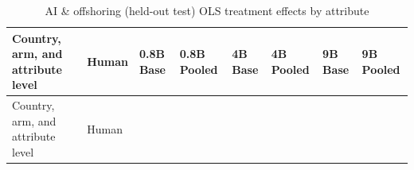 \documentclass[
  11pt,
  letterpaper,
]{article}
\makeatletter
\newcommand\table@defaultsize{\footnotesize}
\let\table@size\table@defaultsize
\newcommand\nexttablesize[1]{\gdef\table@size{#1}}
\makeatother
\begin{document}
\nexttablesize{\scriptsize}
{\def\LTcaptype{apptbl}
\begin{longtable}[]{@{}
  >{\raggedright\arraybackslash}p{}
  >{\raggedleft\arraybackslash}p{}
  >{\raggedleft\arraybackslash}p{}
  >{\raggedleft\arraybackslash}p{}
  >{\raggedleft\arraybackslash}p{}
  >{\raggedleft\arraybackslash}p{}
  >{\raggedleft\arraybackslash}p{}
  >{\raggedleft\arraybackslash}p{}@{}}
\caption{{\label{apptbl-ai-offshoring-slopes}}AI \& offshoring
(held-out test) OLS treatment effects by attribute}\tabularnewline
\toprule\noalign{}
\begin{minipage}[b]{\linewidth}\raggedright
Country, arm, and attribute level
\end{minipage} & \begin{minipage}[b]{\linewidth}\raggedleft
Human
\end{minipage} & \begin{minipage}[b]{\linewidth}\raggedleft
0.8B Base
\end{minipage} & \begin{minipage}[b]{\linewidth}\raggedleft
0.8B Pooled
\end{minipage} & \begin{minipage}[b]{\linewidth}\raggedleft
4B Base
\end{minipage} & \begin{minipage}[b]{\linewidth}\raggedleft
4B Pooled
\end{minipage} & \begin{minipage}[b]{\linewidth}\raggedleft
9B Base
\end{minipage} & \begin{minipage}[b]{\linewidth}\raggedleft
9B Pooled
\end{minipage} \\
\midrule\noalign{}
\endfirsthead
\toprule\noalign{}
\begin{minipage}[b]{\linewidth}\raggedright
Country, arm, and attribute level
\end{minipage} & \begin{minipage}[b]{\linewidth}\raggedleft
Human
\end{minipage} & \begin{minipage}[b]{\linewidth}\raggedleft

\end{minipage}
\end{longtable}}
\end{document}
